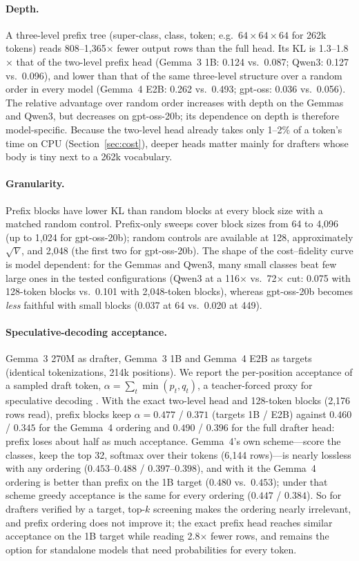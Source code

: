 \documentclass[11pt]{article}
\begin{document}
\paragraph{Depth.} A three-level prefix tree (super-class, class, token; e.g.\ $64\times64\times64$ for 262k tokens) reads 808--1{,}365$\times$ fewer output rows than the full head. Its KL is 1.3--1.8$\times$ that of the two-level prefix head (Gemma~3 1B: 0.124 vs.\ 0.087; Qwen3: 0.127 vs.\ 0.096), and lower than that of the same three-level structure over a random order in every model (Gemma~4 E2B: 0.262 vs.\ 0.493; gpt-oss: 0.036 vs.\ 0.056). The relative advantage over random order increases with depth on the Gemmas and Qwen3, but decreases on gpt-oss-20b; its dependence on depth is therefore model-specific. Because the two-level head already takes only 1--2\% of a token's time on CPU (Section~\ref{sec:cost}), deeper heads matter mainly for drafters whose body is tiny next to a 262k vocabulary.

\paragraph{Granularity.} Prefix blocks have lower KL than random blocks at every block size with a matched random control. Prefix-only sweeps cover block sizes from 64 to 4{,}096 (up to 1{,}024 for gpt-oss-20b); random controls are available at 128, approximately $\sqrt V$, and 2{,}048 (the first two for gpt-oss-20b). The shape of the cost--fidelity curve is model dependent: for the Gemmas and Qwen3, many small classes beat few large ones in the tested configurations (Qwen3 at a 116$\times$ vs.\ 72$\times$ cut: 0.075 with 128-token blocks vs.\ 0.101 with 2{,}048-token blocks), whereas gpt-oss-20b becomes \emph{less} faithful with small blocks (0.037 at 64 vs.\ 0.020 at 449).

\paragraph{Speculative-decoding acceptance.} Gemma~3 270M as drafter, Gemma~3 1B and Gemma~4 E2B as targets (identical tokenizations, 214k positions). We report the per-position acceptance of a sampled draft token, $\alpha=\sum_t\min(p_t,q_t)$, a teacher-forced proxy for speculative decoding \citep{leviathan2023spec}. With the exact two-level head and 128-token blocks (2{,}176 rows read), prefix blocks keep $\alpha=0.477$ / $0.371$ (targets 1B / E2B) against $0.460$ / $0.345$ for the Gemma~4 ordering and $0.490$ / $0.396$ for the full drafter head: prefix loses about half as much acceptance. Gemma~4's own scheme---score the classes, keep the top 32, softmax over their tokens (6{,}144 rows)---is nearly lossless with any ordering ($0.453$--$0.488$ / $0.397$--$0.398$), and with it the Gemma~4 ordering is better than prefix on the 1B target ($0.480$ vs.\ $0.453$); under that scheme greedy acceptance is the same for every ordering ($0.447$ / $0.384$). So for drafters verified by a target, top-$k$ screening makes the ordering nearly irrelevant, and prefix ordering does not improve it; the exact prefix head reaches similar acceptance on the 1B target while reading 2.8$\times$ fewer rows, and remains the option for standalone models that need probabilities for every token.
\end{document}
